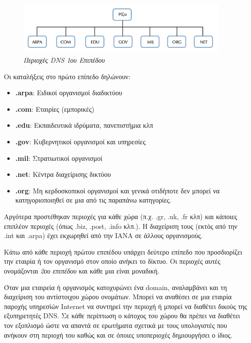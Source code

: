 \begin{figure}[!ht]
  \centering
  \includegraphics[width=0.95\textwidth]{images/chapter6/6-1}
  \caption {\textsl{Περιοχές DNS 1ου Επιπέδου}}
  \label{6-1}
\end{figure}

Οι καταλήξεις στο πρώτο επίπεδο δηλώνουν:

\begin{itemize}
\item \textbf{.arpa}: Ειδικοί οργανισμοί διαδικτύου
\item \textbf{.com}: Εταιρίες (εμπορικές)
\item \textbf{.edu}: Εκπαιδευτικά ιδρύματα, πανεπιστήμια κλπ
\item \textbf{.gov}: Κυβερνητικοί οργανισμοί και υπηρεσίες
\item \textbf{.mil}: Στρατιωτικοί οργανισμοί
\item \textbf{.net}: Κέντρα διαχείρισης δικτύου
\item \textbf{.org}: Μη κερδοσκοπικοί οργανισμοί και γενικά οτιδήποτε δεν μπορεί να κατηγοριοποιηθεί σε μια από τις παραπάνω κατηγορίες.
\end{itemize}

Αργότερα προστέθηκαν περιοχές για κάθε χώρα (π.χ. .gr, .uk, .fr κλπ) και κάποιες επιπλέον περιοχές (όπως .biz, .post, .info κλπ.). Η διαχείριση τους (εκτός από την .int και .arpa) έχει εκχωρηθεί από την IANA σε άλλους οργανισμούς.

Κάτω από κάθε περιοχή πρώτου επιπέδου υπάρχει δεύτερο επίπεδο που προσδιορίζει την εταιρία ή τον οργανισμό στον οποίο ανήκει το δίκτυο. Οι περιοχές αυτές ονομάζονται \emph{2ου επιπέδου} και κάθε μια είναι μοναδική. 

Όταν μια εταιρεία ή οργανισμός κατοχυρώνει ένα domain, αναλαμβάνει και τη διαχείριση του αντίστοιχου χώρου ονομάτων. Μπορεί να αναθέσει σε μια εταιρία παροχής υπηρεσίών Internet να συντηρεί την περιοχή ή μπορεί να διαθέτει δικούς της εξυπηρετητές DNS. Σε κάθε περίπτωση ο κάτοχος του χώρου θα πρέπει να διαθέτει τον εξοπλισμό ώστε να απαντά σε ερωτήματα σχετικά με τους υπολογιστές που ανήκουν στη περιοχή του καθώς και σε όποιες υποπεριοχές δημιουργήσει ο ίδιος.

